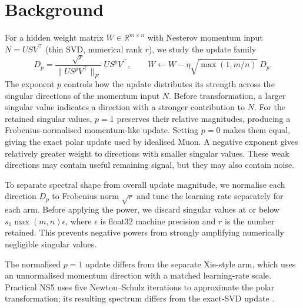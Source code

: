 \documentclass[11pt,a4paper]{article}
\begin{document}
\section{Background}\label{sec:background}
For a hidden weight matrix $W \in \mathbb{R}^{m \times n}$ with Nesterov momentum input
$N = U S V^\top$ (thin SVD, numerical rank $r$), we study the update family
\begin{equation}
  D_p = \frac{\sqrt{r}}{\lVert U S^{p} V^\top \rVert_F}\; U S^{p} V^\top ,
  \qquad
  W \leftarrow W - \eta \sqrt{\max(1, m/n)}\; D_p .
  \label{eq:family}
\end{equation}
The exponent $p$ controls how the update distributes its strength across the singular directions of the momentum input $N$. Before transformation, a larger singular value indicates a direction with a stronger contribution to $N$. For the retained singular values, $p=1$ preserves their relative magnitudes, producing a Frobenius-normalised momentum-like update. Setting $p=0$ makes them equal, giving the exact polar update used by idealised Muon. A negative exponent gives relatively greater weight to directions with smaller singular values. These weak directions may contain useful remaining signal, but they may also contain noise.

To separate spectral shape from overall update magnitude, we normalise each direction $D_p$ to Frobenius norm $\sqrt{r}$ and tune the learning rate separately for each arm. Before applying the power, we discard singular values at or below $s_1\max(m,n)\epsilon$, where $\epsilon$ is float32 machine precision and $r$ is the number retained. This prevents negative powers from strongly amplifying numerically negligible singular values.

The normalised $p=1$ update differs from the separate Xie-style arm, which uses an unnormalised momentum direction with a matched learning-rate scale. Practical NS5 uses five Newton--Schulz iterations to approximate the polar transformation; its resulting spectrum differs from the exact-SVD update \citep{jordan2024muon}.
\end{document}
